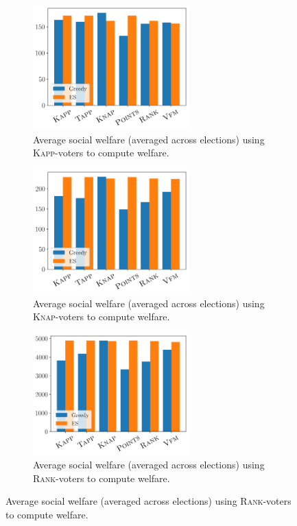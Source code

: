 \documentclass{comsoc2023}
\newcommand{\rank}{\textsc{Rank}}
\newcommand{\knap}{\textsc{Knap}}
\newcommand{\kapp}{\textsc{Kapp}}
\begin{document}
\begin{figure}[ht]
     \centering
          \begin{subfigure}[b]{0.45\textwidth}
         \centering
       \includegraphics[width=6cm]{experiment/k_approval_welfare.png}
\caption{Average social welfare (averaged across elections) using \kapp{}-voters to compute welfare.
}\label{fig:kapp_welfare}
     \end{subfigure}\hfill
     \begin{subfigure}[b]{0.45\textwidth}
         \centering
         \includegraphics[width=6cm]{experiment/Knapsack_welfare.png}
\caption{Average social welfare (averaged across elections) using \knap{}-voters to compute welfare.
}\label{fig:knap_welfare}
     \end{subfigure}
     \hfill
     \begin{subfigure}[b]{0.45\textwidth}
         \centering
         \includegraphics[width=6cm]{experiment/Ranking_value_welfare.png}
\caption{Average social welfare (averaged across elections) using \rank{}-voters to compute welfare.
}\label{fig:rank_welfare}
     \end{subfigure}

\end{figure}
\end{document}
